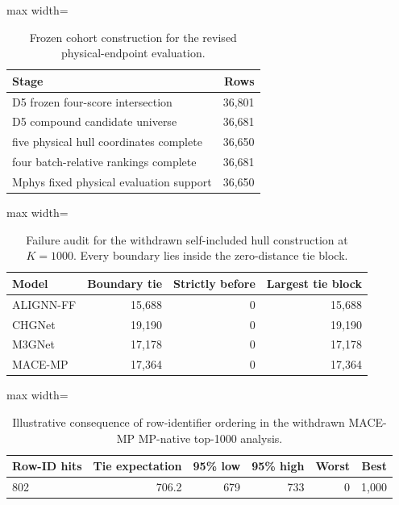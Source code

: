 \begin{table}[H]
\centering
\sitablefont
\caption{Frozen cohort construction for the revised physical-endpoint evaluation.}
\label{tab:v3-support}
\begin{adjustbox}{max width=\linewidth}
\begin{tabular}{@{}lr@{}}
\toprule
Stage & Rows \\
\midrule
D5 frozen four-score intersection & 36,801 \\
D5 compound candidate universe & 36,681 \\
five physical hull coordinates complete & 36,650 \\
four batch-relative rankings complete & 36,681 \\
Mphys fixed physical evaluation support & 36,650 \\
\bottomrule
\end{tabular}
\end{adjustbox}
\end{table}


\begin{table}[H]
\centering
\sitablefont
\caption{Failure audit for the withdrawn self-included hull construction at $K=1000$. Every boundary lies inside the zero-distance tie block.}
\label{tab:v3-old-ties}
\begin{adjustbox}{max width=\linewidth}
\begin{tabular}{@{}lrrr@{}}
\toprule
Model & Boundary tie & Strictly before & Largest tie block \\
\midrule
ALIGNN-FF & 15,688 & 0 & 15,688 \\
CHGNet & 19,190 & 0 & 19,190 \\
M3GNet & 17,178 & 0 & 17,178 \\
MACE-MP & 17,364 & 0 & 17,364 \\
\bottomrule
\end{tabular}
\end{adjustbox}
\end{table}


\begin{table}[H]
\centering
\sitablefont
\caption{Illustrative consequence of row-identifier ordering in the withdrawn MACE-MP MP-native top-1000 analysis.}
\label{tab:v3-old-mace}
\begin{adjustbox}{max width=\linewidth}
\begin{tabular}{@{}lrrrrr@{}}
\toprule
Row-ID hits & Tie expectation & 95\% low & 95\% high & Worst & Best \\
\midrule
802 & 706.2 & 679 & 733 & 0 & 1,000 \\
\bottomrule
\end{tabular}
\end{adjustbox}
\end{table}


